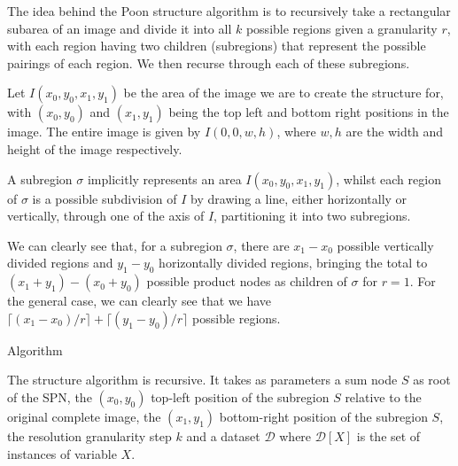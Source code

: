 \documentclass{amsart}
\makeatletter
\def\subsection{\@startsection{subsection}{3}%
  \z@{.5\linespacing\@plus.7\linespacing}{.1\linespacing}%
  {\normalfont}}
\theoremstyle{plain}
\newcounter{dummy-def}\numberwithin{dummy-def}{section}
\newcounter{dummy-thm}\numberwithin{dummy-thm}{section}
\newcounter{dummy-prop}\numberwithin{dummy-prop}{section}
\newtheorem{proposition}[dummy-prop]{Proposition}
\newcounter{dummy-corollary}\numberwithin{dummy-corollary}{section}
\newcounter{dummy-lemma}\numberwithin{dummy-lemma}{section}
\newcounter{dummy-ex}\numberwithin{dummy-ex}{section}
\newcounter{dummy-eg}\numberwithin{dummy-eg}{section}
\numberwithin{equation}{section}
\newcommand{\dset}[1]{\mathcal{#1}}
\makeatother
\begin{document}
The idea behind the Poon structure algorithm is to recursively take a rectangular subarea of an
image and divide it into all $k$ possible regions given a granularity $r$, with each region having
two children (subregions) that represent the possible pairings of each region. We then recurse
through each of these subregions.

Let $I (x_0, y_0, x_1, y_1)$ be the area of the image we are to create the structure for, with
$ (x_0, y_0)$ and $ (x_1, y_1)$ being the top left and bottom right positions in the image. The
entire image is given by $I (0, 0, w, h)$, where $w, h$ are the width and height of the image
respectively.

A subregion $\sigma$ implicitly represents an area $I (x_0, y_0, x_1, y_1)$, whilst each region of
$\sigma$ is a possible subdivision of $I$ by drawing a line, either horizontally or vertically,
through one of the axis of $I$, partitioning it into two subregions.

We can clearly see that, for a subregion $\sigma$, there are $x_1-x_0$ possible vertically divided
regions and $y_1-y_0$ horizontally divided regions, bringing the total to $ (x_1+y_1)- (x_0+y_0)$
possible product nodes as children of $\sigma$ for $r=1$. For the general case, we can clearly see
that we have $\lceil (x_1-x_0)/r\rceil + \lceil (y_1-y_0)/r\rceil$ possible regions.


\subsection{Algorithm}

The structure algorithm is recursive. It takes as parameters a sum node $S$ as root of the SPN, the
$ (x_0,y_0)$ top-left position of the subregion $S$ relative to the original complete image, the
$ (x_1,y_1)$ bottom-right position of the subregion $S$, the resolution granularity step $k$ and a
dataset $\dset{D}$ where $\dset{D}[X]$ is the set of instances of variable $X$.
\end{document}
